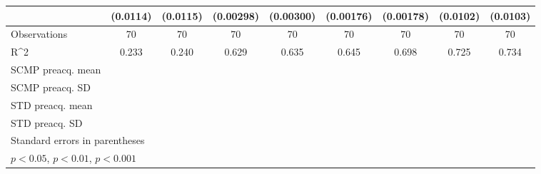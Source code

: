\begin{sidewaystable}[htbp]
\begin{tabular}{l*{8}{c}}
                & (0.0114)         & (0.0115)         &(0.00298)         &(0.00300)         &(0.00176)         &(0.00178)         & (0.0102)         & (0.0103)         \\
\hline
Observations    &       70         &       70         &       70         &       70         &       70         &       70         &       70         &       70         \\
R^2             &    0.233         &    0.240         &    0.629         &    0.635         &    0.645         &    0.698         &    0.725         &    0.734         \\
SCMP preacq. mean&                  &                  &                  &                  &                  &                  &                  &                  \\
SCMP preacq. SD &                  &                  &                  &                  &                  &                  &                  &                  \\
STD preacq. mean&                  &                  &                  &                  &                  &                  &                  &                  \\
STD preacq. SD  &                  &                  &                  &                  &                  &                  &                  &                  \\
\hline\hline
\multicolumn{9}{l}{\footnotesize Standard errors in parentheses}\\
\multicolumn{9}{l}{\footnotesize \sym{*} \(p<0.05\), \sym{**} \(p<0.01\), \sym{***} \(p<0.001\)}\\
\end{tabular}
\end{sidewaystable}
